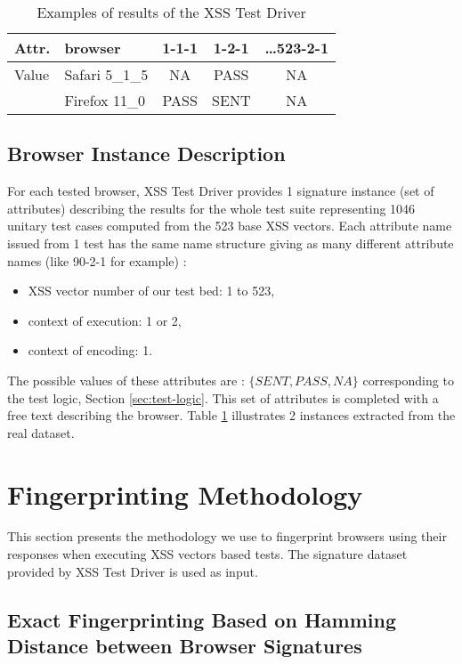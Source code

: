 \documentclass[10pt]{IEEEtran}
\begin{document}
\begin{table}\center
\caption{Examples of results of the XSS Test Driver\label{rawinstance}}
\begin{tabular}{l|l|c|c|c}
\hline
Attr. & browser  & 1-1-1 &  1-2-1 & \ldots523-2-1 \\
\hline
Value & Safari 5\_1\_5 & NA &  PASS  & NA  \\
\cline{2-5}
         & Firefox 11\_0 &  PASS & SENT  & NA  \\      
\hline
\end{tabular}
\label{tab:instance-example}
\end{table}
\subsection{Browser Instance Description}
For each tested browser, XSS Test Driver provides 1 signature instance (set of attributes) 
describing the results for the whole test suite 
representing 1046 unitary test cases computed from the 523 base XSS vectors. 
Each attribute name issued from 1 test has the same name
structure giving as many different attribute names (like 90-2-1 for example) :
\begin{itemize}
        \item XSS vector number of our test bed: 1 to 523,
        \item context of execution: 1 or 2,
        \item context of encoding: 1.
\end{itemize}
The possible values of these attributes are : $\{SENT,PASS,NA\}$ corresponding to the test logic,  
Section \ref{sec:test-logic}.
This set of attributes is completed with a free text describing the browser. 
Table \ref{tab:instance-example} illustrates 2 instances extracted from the real dataset.




\section{Fingerprinting Methodology}
\label{sec:fingerprinting-methodology}
This section presents the methodology we use to fingerprint browsers using their responses 
 when executing XSS vectors based tests. The signature dataset provided by XSS Test Driver is used as input.




\subsection{Exact Fingerprinting Based on Hamming Distance between Browser Signatures}
\label{sec:method-exact-fingerprinting}
\end{document}
